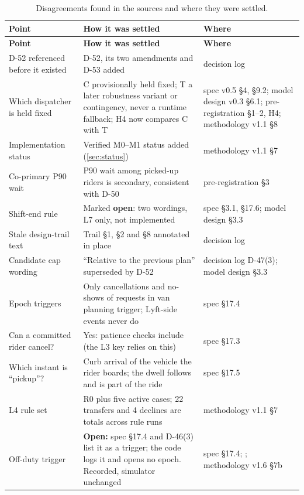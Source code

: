 \documentclass[11pt,letterpaper]{article}
\DeclareRobustCommand{\st}[1]{\texttt{\detokenize{#1}}}
\DeclareRobustCommand{\fn}[1]{\texttt{\detokenize{#1}}}
\newcommand{\D}[1]{D-#1}
\begin{document}
{\small
\begin{longtable}{@{}P{3.3cm}P{6.2cm}P{4.0cm}@{}}
\caption{Disagreements found in the sources and where they were settled.}\label{tab:gaps}\\
\toprule
\textbf{Point} & \textbf{How it was settled} & \textbf{Where}\\
\midrule
\endfirsthead
\toprule
\textbf{Point} & \textbf{How it was settled} & \textbf{Where}\\
\midrule
\endhead
\bottomrule
\endfoot
D-52 referenced before it existed & D-52, its two amendments and D-53 added & decision log\\
Which dispatcher is held fixed & C provisionally held fixed; T a later robustness variant or contingency, never a runtime fallback; H4 now compares C with T & spec v0.5 §4, §9.2; model design v0.3 §6.1; pre-registration §1--2, H4; methodology v1.1 §8\\
Implementation status & Verified M0--M1 status added (\cref{sec:status}) & methodology v1.1 §7\\
Co-primary P90 wait & P90 wait among picked-up riders is secondary, consistent with \D{50} & pre-registration §3\\
Shift-end rule & Marked \textbf{open}: two wordings, L7 only, not implemented & spec §3.1, §17.6; model design §3.3\\
Stale design-trail text & Trail §1, §2 and §8 annotated in place & decision log\\
Candidate cap wording & ``Relative to the previous plan'' superseded by \D{52} & decision log \D{47}(3); model design §3.3\\
Epoch triggers & Only cancellations and no-shows of requests in van planning trigger; Lyft-side events never do & spec §17.4\\
Can a committed rider cancel? & Yes: patience checks include \st{committed} (the L3 key relies on this) & spec §17.3\\
Which instant is ``pickup''? & Curb arrival of the vehicle the rider boards; the dwell follows and is part of the ride & spec §17.5\\
L4 rule set & R0 plus five active cases; 22 transfers and 4 declines are totals across rule runs & methodology v1.1 §7\\
Off-duty trigger & \textbf{Open:} spec §17.4 and \D{46}(3) list it as a trigger; the code logs it and opens no epoch. Recorded, simulator unchanged & spec §17.4; \fn{src/sim/engine.py}; methodology v1.6 §7b\\
\end{longtable}
}
\end{document}
